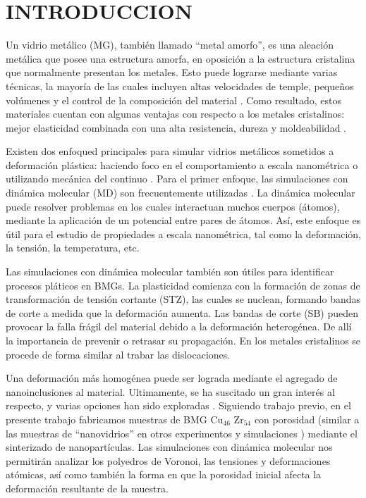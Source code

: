 \section{INTRODUCCION}
\label{S5_1}

Un vidrio metálico (MG), también llamado ``metal amorfo'', es una aleación metálica que posee una estructura amorfa,
en oposición a la estructura cristalina que normalmente presentan los metales. Esto puede lograrse mediante varias técnicas,
la mayoría de las cuales incluyen altas velocidades de temple, peque\~nos volúmenes y el control de la composición del
material \citep{liebe93}. Como resultado, estos materiales cuentan con algunas ventajas con respecto a los metales cristalinos:
mejor elasticidad combinada con una alta resistencia, dureza y moldeabilidad \citep{telford04}.

Existen dos enfoqued principales para simular vidrios metálicos sometidos a deformación plástica: haciendo foco en el comportamiento
a escala nanométrica \citep{ogata06,guan10} o utilizando mecánica del continuo \citep{malvern69}. Para el primer enfoque, las simulaciones
con dinámica molecular (MD) son frecuentemente utilizadas \citep{allen87}. La dinámica molecular puede resolver problemas en los cuales
interactuan muchos cuerpos (átomos), mediante la aplicación de un potencial entre pares de átomos. Así, este enfoque es útil para el
estudio de propiedades a escala nanométrica, tal como la deformación, la tensión, la temperatura, etc.

Las simulaciones con dinámica molecular también son útiles para identificar procesos pláticos en BMGs. La plasticidad comienza con la
formación de zonas de transformación de tensión cortante (STZ), las cuales se nuclean, formando bandas de corte \citep{ogata06,shimizu07} a medida que la
deformación aumenta. Las bandas de corte (SB) pueden provocar la falla frágil del material debido a la deformación heterogénea. De allí la importancia
de prevenir o retrasar su propagación. En los metales cristalinos se procede de forma similar al trabar las dislocaciones.

Una deformación más homogénea puede ser lograda mediante el agregado de nanoinclusiones al material. Ultimamente, se ha suscitado
un gran interés al respecto, y varias opciones han sido exploradas \citep{guan13,wang10,schuh07,liontas14}. Siguiendo trabajo previo, en el
presente trabajo fabricamos muestras de BMG Cu$_{46}$ Zr$_{54}$ con porosidad (similar a las muestras de ``nanovidrios'' en otros
experimentos y simulaciones \citep{adibi13,albe13}) mediante el sinterizado de nanopartículas. Las simulaciones con dinámica molecular
nos permitirán analizar los polyedros de Voronoi, las tensiones y deformaciones atómicas, así como también la forma en que la porosidad inicial
afecta la deformación resultante de la muestra.

